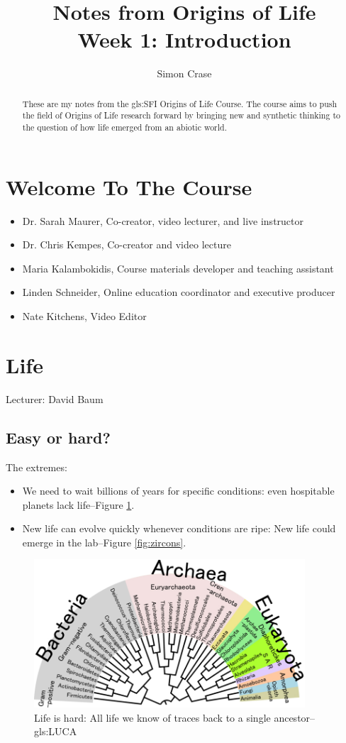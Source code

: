 \documentclass[]{article}
\title{
	Notes from Origins of Life\\
	Week 1: Introduction
}
\author{Simon Crase}
\begin{document}
\maketitle

\begin{abstract}
    These are my notes from the \gls{gls:SFI} Origins of Life Course\cite{sfi2019}. The course aims to push the field of Origins of Life research forward by bringing new and synthetic thinking to the question of how life emerged from an abiotic world.

\end{abstract}

\setcounter{tocdepth}{2}
\tableofcontents


\section{Welcome To The Course}
\begin{itemize}
	\item Dr. Sarah Maurer, Co-creator, video lecturer, and live instructor
	\item Dr. Chris Kempes, Co-creator and video lecture
	\item Maria Kalambokidis, Course materials developer and teaching assistant
	\item Linden Schneider, Online education coordinator and executive producer
	\item Nate Kitchens, Video Editor
\end{itemize}
\section{Life}
Lecturer: David Baum
\subsection{Easy or hard?}
The extremes:
\begin{itemize}
	\item We need to wait billions of years for specific conditions: even hospitable planets lack life--Figure \ref{fig:luca}.
	\item New life can evolve quickly whenever conditions are ripe:  New life could emerge in the lab--Figure \ref{fig:zircons}.
\end{itemize}

\begin{figure}[H]
	\caption{Life is hard: All life we know of traces back to a single 		ancestor--\gls{gls:LUCA}}\label{fig:luca} 
	\includegraphics[width=0.9\textwidth]{Luca}
\end{figure}
\end{document}
